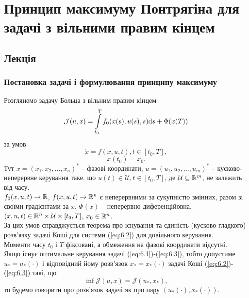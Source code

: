 \setcounter{section}{6}


\section{Принцип максимуму Понтрягіна для задачі з вільними правим кінцем}

\subsection{Лекція}

\subsubsection{Постановка задачі і формулювання принципу максимуму}

Розглянемо задачу Больца з вільним правим кінцем
\begin{equation}
    \label{eq:6.1}
    \mathcal{J}(u, x) = \displaystyle\int\limits_{t_0}^T f_0 (x(s), u(s), s) \mathrm{d} s + \Phi(x(T))
\end{equation}
за умов
\begin{equation}
    \label{eq:6.2}
    \dot x = f(x, u, t), t \in [t_0, T],
\end{equation}
\begin{equation}
    \label{eq:6.3}
    x(t_0) = x_0.
\end{equation}
Тут $x = (x_1, x_2, \ldots, x_n)^*$ -- фазові координати, $u = (u_1, u_2, \ldots, u_m)^*$ -- кусково-неперервне керування таке. що $u(t) \in \mathcal{U}, t \in [t_0, T]$, де $\mathcal{U} \subseteq \mathbb{R}^m$, не залежить від часу. \\

$f_0(x, u, t) \to \mathbb{R}$, $f(x, u, t) \to \mathbb{R}^n$ є неперервними за сукупністю змінних, разом зі своїми градієнтами за $x$, $\Phi(x)$ -- неперервно диференційовна, $(x, u, t) \in \mathbb{R}^n \times \mathcal{U} \times [t_0, T]$, $x_0 \in \mathbb{R}^n$. \\

За цих умов справджується теорема про існування та єдиність (кусково-гладкого) розв'язку задачі Коші для системи (\ref{eq:6.2}) для довільного керування. \\

Моменти часу $t_0$ і $T$ фіксовані, а обмеження на фазові координати відсутні. \\

Якщо існує оптимальне керування задачі (\ref{eq:6.1})-(\ref{eq:6.3}), тобто допустиме $u_* = u_*(\cdot)$ і відповідний йому розв'язок $x_* = x_*(\cdot)$ задачі Коші (\ref{eq:6.2})-(\ref{eq:6.3}) такі, що
\begin{equation*}
    \inf \mathcal{J}(u, x) = \mathcal{J}(u_*, x_*),
\end{equation*}
то будемо говорити про розв'язок задачі як про пару $(u_*(\cdot), x_*(\cdot))$. \\

